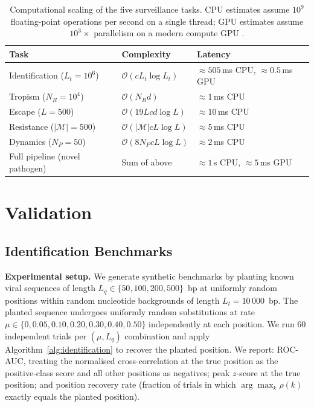 \documentclass[twocolumn,11pt,a4paper]{article}
\theoremstyle{definition}
\theoremstyle{remark}
\newcommand{\bigO}{\mathcal{O}}
\begin{document}
\begin{table}[h]
\centering
\caption{Computational scaling of the five surveillance tasks. CPU estimates
assume $10^9$ floating-point operations per second on a single thread; GPU
estimates assume $10^3{\times}$ parallelism on a modern compute GPU
\citep{moreland2003, govindaraju2008}.}
\label{tab:scaling}
\small
\begin{tabular}{@{}lll@{}}
\toprule
Task & Complexity & Latency \\
\midrule
Identification ($L_t = 10^6$) & $\bigO(c L_t \log L_t)$ &
  ${\approx}505$\,ms CPU, ${\approx}0.5$\,ms GPU \\
Tropism ($N_R = 10^4$) & $\bigO(N_R d)$ & ${\approx}1$\,ms CPU \\
Escape ($L = 500$) & $\bigO(19L c d \log L)$ & ${\approx}10$\,ms CPU \\
Resistance ($|\mathcal{M}| = 500$) & $\bigO(|\mathcal{M}| c L \log L)$ &
  ${\approx}5$\,ms CPU \\
Dynamics ($N_P = 50$) & $\bigO(8 N_P c L \log L)$ & ${\approx}2$\,ms CPU \\
Full pipeline (novel pathogen) & Sum of above & ${\approx}1$\,s CPU,
  ${\approx}5$\,ms GPU \\
\bottomrule
\end{tabular}
\end{table}

\section{Validation}
\label{sec:validation}

\subsection{Identification Benchmarks}
\label{subsec:id_bench}

\noindent\textbf{Experimental setup.} We generate synthetic benchmarks by
planting known viral sequences of length $L_q \in \{50, 100, 200, 500\}$~bp at
uniformly random positions within random nucleotide backgrounds of length
$L_t = 10\,000$~bp. The planted sequence undergoes uniformly random
substitutions at rate $\mu \in \{0, 0.05, 0.10, 0.20, 0.30, 0.40, 0.50\}$
independently at each position. We run 60 independent trials per
$(\mu, L_q)$ combination and apply Algorithm~\ref{alg:identification} to
recover the planted position. We report: ROC-AUC, treating the normalised
cross-correlation at the true position as the positive-class score and all other
positions as negatives; peak $z$-score at the true position; and position
recovery rate (fraction of trials in which $\arg\max_k \rho(k)$ exactly equals
the planted position).
\end{document}
